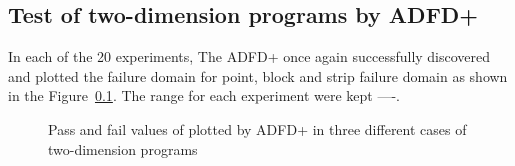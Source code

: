\documentclass{acm_proc_article-sp}
\begin{document}
\subsection{Test of two-dimension programs by ADFD+}
In each of the 20 experiments, The ADFD+ once again successfully discovered and plotted the failure domain for point, block and strip failure domain as shown in the Figure~\ref{}. The range for each experiment were kept ----.

\begin{figure} [H]

\caption{Pass and fail values of plotted by ADFD+ in three different cases of two-dimension programs}

\end{figure}
\end{document}
